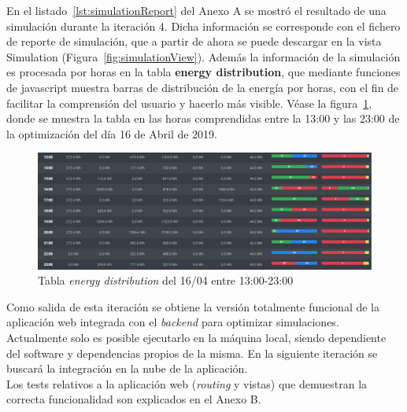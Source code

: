 En el listado~\ref{lst:simulationReport} del Anexo A se mostró el resultado de una simulación durante la iteración 4. Dicha información se corresponde con el fichero de reporte de simulación, que a partir de ahora se puede descargar en la vista Simulation (Figura~\ref{fig:simulationView}). Además la información de la simulación es procesada por horas en la tabla \textbf{energy distribution}, que mediante funciones de javascript muestra barras de distribución de la energía por horas, con el fin de facilitar la comprensión del usuario y hacerlo más visible. Véase la figura~\ref{fig:energyDistrib}, donde se muestra la tabla en las horas comprendidas entre la 13:00 y las 23:00 de la optimización del día 16 de Abril de 2019.
\begin{figure}[H]
            \centering
            \includegraphics[width=17cm]{figs/energy_distrib.png}
            \caption{Tabla \textit{energy distribution} del 16/04 entre 13:00-23:00}
            \label{fig:energyDistrib}
\end{figure}


Como salida de esta iteración se obtiene la versión totalmente funcional de la aplicación web integrada con el \textit{backend} para optimizar simulaciones. Actualmente solo es posible ejecutarlo en la máquina local, siendo dependiente del software y dependencias propios de la misma. En la siguiente iteración se buscará la integración en la nube de la aplicación.\\

Los tests relativos a la aplicación web (\textit{routing} y vistas) que demuestran la correcta funcionalidad son explicados en el Anexo B.
